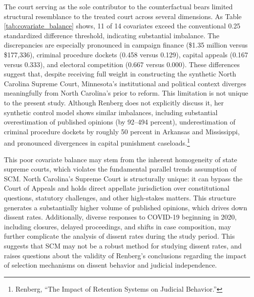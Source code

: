 The court serving as the sole contributor to the counterfactual bears
limited structural resemblance to the treated court across several
dimensions. As Table \ref{tab:covariate_balance} shows, 11 of 14
covariates exceed the conventional 0.25 standardized difference
threshold, indicating substantial imbalance. The discrepancies are
especially pronounced in campaign finance (\$1.35 million versus
\$177,336), criminal procedure dockets (0.458 versus 0.129), capital
appeals (0.167 versus 0.333), and electoral competition (0.667 versus
0.000). These differences suggest that, despite receiving full weight in
constructing the synthetic North Carolina Supreme Court, Minnesota's
institutional and political context diverges meaningfully from North
Carolina's prior to reform. This limitation is not unique to the present
study. Although Renberg does not explicitly discuss it, her synthetic
control model shows similar imbalances, including substantial
overestimation of published opinions (by 92--494 percent),
underestimation of criminal procedure dockets by roughly 50 percent in
Arkansas and Mississippi, and pronounced divergences in capital
punishment caseloads.\footnote{Renberg, {``The {Impact} of {Retention
  Systems} on {Judicial Behavior}.''}}

This poor covariate balance may stem from the inherent homogeneity of
state supreme courts, which violates the fundamental parallel trends
assumption of SCM. North Carolina's Supreme Court is structurally
unique: it can bypass the Court of Appeals and holds direct appellate
jurisdiction over constitutional questions, statutory challenges, and
other high-stakes matters. This structure generates a substantially
higher volume of published opinions, which drives down dissent rates.
Additionally, diverse responses to COVID-19 beginning in 2020, including
closures, delayed proceedings, and shifts in case composition, may
further complicate the analysis of dissent rates during the study
period. This suggests that SCM may not be a robust method for studying
dissent rates, and raises questions about the validity of Renberg's
conclusions regarding the impact of selection mechanisms on dissent
behavior and judicial independence.

